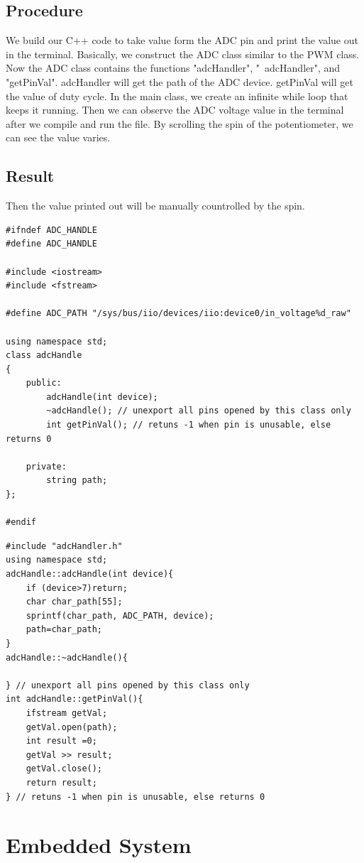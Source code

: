 \documentclass{article}
\begin{document}
\subsection{Procedure}
We build our C++ code to take value form the ADC pin and print the value out in the terminal.
Basically, we construct the ADC class similar to the PWM class. Now the ADC class contains the functions "adcHandler", "~adcHandler", and "getPinVal". adcHandler will get the path of the ADC device. getPinVal will get the value of duty cycle. In the main class, we create an infinite while loop that keeps it running.
Then we can observe the ADC voltage value in the terminal after we compile and run the file. By scrolling the spin of the potentiometer, we can see the value varies. 
\subsection{Result}
Then the value printed out will be manually countrolled by the spin. 
\begin{lstlisting}
#ifndef ADC_HANDLE
#define ADC_HANDLE

#include <iostream>
#include <fstream>

#define ADC_PATH "/sys/bus/iio/devices/iio:device0/in_voltage%d_raw"

using namespace std;
class adcHandle
{
	public:
		adcHandle(int device);
		~adcHandle(); // unexport all pins opened by this class only
		int getPinVal(); // retuns -1 when pin is unusable, else returns 0
	
	private:
		string path;
};

#endif
\end{lstlisting}
\begin{lstlisting}
#include "adcHandler.h"
using namespace std;
adcHandle::adcHandle(int device){
	if (device>7)return;
	char char_path[55];
	sprintf(char_path, ADC_PATH, device);
	path=char_path;
}
adcHandle::~adcHandle(){

} // unexport all pins opened by this class only
int adcHandle::getPinVal(){
	ifstream getVal;
	getVal.open(path);
	int result =0;
	getVal >> result;
	getVal.close();
	return result;
} // retuns -1 when pin is unusable, else returns 0
\end{lstlisting}
\clearpage
\section{Embedded System}
\end{document}
